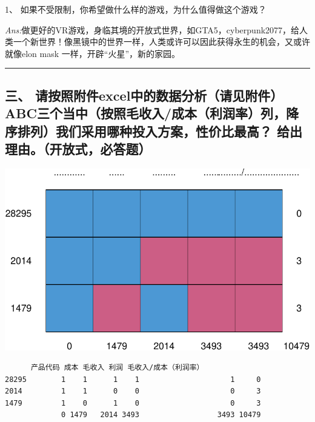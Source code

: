 \documentclass[
]{article}
\begin{document}
1、 如果不受限制，你希望做什么样的游戏，为什么值得做这个游戏？

{\emph{Ans:}做更好的VR游戏，身临其境的开放式世界，如GTA5，cyberpunk2077，给人类一个新世界！像黑镜中的世界一样，人类或许可以因此获得永生的机会，又或许就像elon
mask 一样，开辟``火星''，新的家园。}

\begin{center}\rule{0.5\linewidth}{0.5pt}\end{center}

\hypertarget{ux4e09-ux8bf7ux6309ux7167ux9644ux4ef6excelux4e2dux7684ux6570ux636eux5206ux6790ux8bf7ux89c1ux9644ux4ef6abcux4e09ux4e2aux5f53ux4e2dux6309ux7167ux6bdbux6536ux5165ux6210ux672cux5229ux6da6ux7387ux5217ux964dux5e8fux6392ux5217ux6211ux4eecux91c7ux7528ux54eaux79cdux6295ux5165ux65b9ux6848ux6027ux4ef7ux6bd4ux6700ux9ad8-ux7ed9ux51faux7406ux7531ux5f00ux653eux5f0fux5fc5ux7b54ux9898}{%
\subsection{三、
请按照附件excel中的数据分析（请见附件）ABC三个当中（按照毛收入/成本（利润率）列，降序排列）我们采用哪种投入方案，性价比最高？
给出理由。（开放式，必答题）}\label{ux4e09-ux8bf7ux6309ux7167ux9644ux4ef6excelux4e2dux7684ux6570ux636eux5206ux6790ux8bf7ux89c1ux9644ux4ef6abcux4e09ux4e2aux5f53ux4e2dux6309ux7167ux6bdbux6536ux5165ux6210ux672cux5229ux6da6ux7387ux5217ux964dux5e8fux6392ux5217ux6211ux4eecux91c7ux7528ux54eaux79cdux6295ux5165ux65b9ux6848ux6027ux4ef7ux6bd4ux6700ux9ad8-ux7ed9ux51faux7406ux7531ux5f00ux653eux5f0fux5fc5ux7b54ux9898}}

\includegraphics{yansiming_dataScience_files/figure-latex/unnamed-chunk-2-1.pdf}

\begin{verbatim}
      产品代码 成本 毛收入 利润 毛收入/成本（利润率）      
28295        1    1      1    1                     1     0
2014         1    1      0    0                     0     3
1479         1    0      1    0                     0     3
             0 1479   2014 3493                  3493 10479
\end{verbatim}
\end{document}
